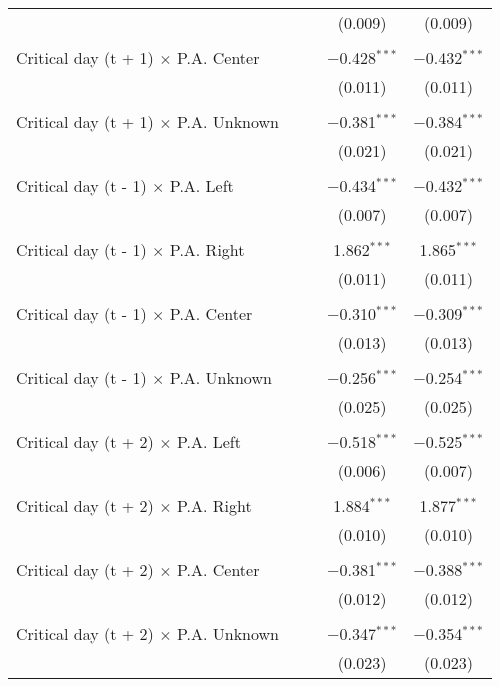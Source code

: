 \documentclass[
]{article}
\begin{document}
\begin{table}[!htbp]
{\begin{tabular}{@{\extracolsep{5pt}}lcccc}
  &  &  & (0.009) & (0.009) \\ 
  & & & & \\ 
 Critical day (t + 1) $\times$ P.A. Center &  &  & $-$0.428$^{***}$ & $-$0.432$^{***}$ \\ 
  &  &  & (0.011) & (0.011) \\ 
  & & & & \\ 
 Critical day (t + 1) $\times$ P.A. Unknown &  &  & $-$0.381$^{***}$ & $-$0.384$^{***}$ \\ 
  &  &  & (0.021) & (0.021) \\ 
  & & & & \\ 
 Critical day (t - 1) $\times$ P.A. Left &  &  & $-$0.434$^{***}$ & $-$0.432$^{***}$ \\ 
  &  &  & (0.007) & (0.007) \\ 
  & & & & \\ 
 Critical day (t - 1) $\times$ P.A. Right &  &  & 1.862$^{***}$ & 1.865$^{***}$ \\ 
  &  &  & (0.011) & (0.011) \\ 
  & & & & \\ 
 Critical day (t - 1) $\times$ P.A. Center &  &  & $-$0.310$^{***}$ & $-$0.309$^{***}$ \\ 
  &  &  & (0.013) & (0.013) \\ 
  & & & & \\ 
 Critical day (t - 1) $\times$ P.A. Unknown &  &  & $-$0.256$^{***}$ & $-$0.254$^{***}$ \\ 
  &  &  & (0.025) & (0.025) \\ 
  & & & & \\ 
 Critical day (t + 2) $\times$ P.A. Left &  &  & $-$0.518$^{***}$ & $-$0.525$^{***}$ \\ 
  &  &  & (0.006) & (0.007) \\ 
  & & & & \\ 
 Critical day (t + 2) $\times$ P.A. Right &  &  & 1.884$^{***}$ & 1.877$^{***}$ \\ 
  &  &  & (0.010) & (0.010) \\ 
  & & & & \\ 
 Critical day (t + 2) $\times$ P.A. Center &  &  & $-$0.381$^{***}$ & $-$0.388$^{***}$ \\ 
  &  &  & (0.012) & (0.012) \\ 
  & & & & \\ 
 Critical day (t + 2) $\times$ P.A. Unknown &  &  & $-$0.347$^{***}$ & $-$0.354$^{***}$ \\ 
  &  &  & (0.023) & (0.023) \\ 

\end{tabular}}
\end{table}
\end{document}
